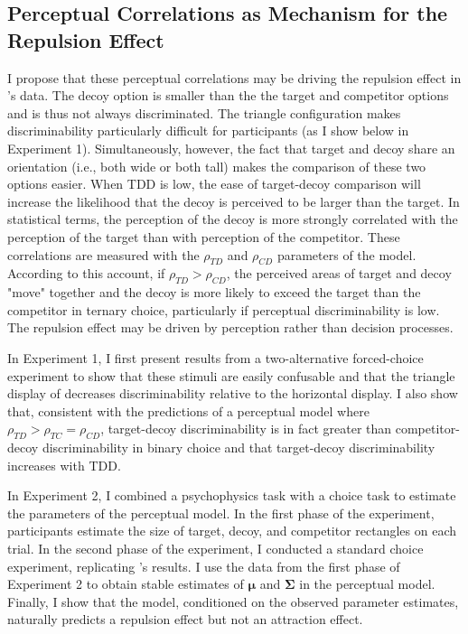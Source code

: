 \subsection{Perceptual Correlations as Mechanism for the Repulsion Effect}
I propose that these perceptual correlations may be driving the repulsion effect in \textcite{spektorWhenGoodLooks2018b}'s data. The decoy option is smaller than the the target and competitor options and is thus not always discriminated. The triangle configuration makes discriminability particularly difficult for participants (as I show below in Experiment 1). Simultaneously, however, the fact that target and decoy share an orientation (i.e., both wide or both tall) makes the comparison of these two options easier. When TDD is low, the ease of target-decoy comparison will increase the likelihood that the decoy is perceived to be larger than the target. In statistical terms, the perception of the decoy is more strongly correlated with the perception of the target than with perception of the competitor. These correlations are measured with the $\rho_{TD}$ and $\rho_{CD}$ parameters of the model. According to this account, if $\rho_{TD}>\rho_{CD}$, the perceived areas of target and decoy "move" together and the decoy is more likely to exceed the target than the competitor in ternary choice, particularly if perceptual discriminability is low. The repulsion effect may be driven by perception rather than decision processes. 

In Experiment 1, I first present results from a two-alternative forced-choice experiment to show that these stimuli are easily confusable and that the triangle display of \textcite{spektorWhenGoodLooks2018b} decreases discriminability relative to the horizontal display. I also show that, consistent with the predictions of a perceptual model where $\rho_{TD}>\rho_{TC}=\rho_{CD}$, target-decoy discriminability is in fact greater than competitor-decoy discriminability in binary choice and that target-decoy discriminability increases with TDD. 

In Experiment 2, I combined a psychophysics task with a choice task to estimate the parameters of the perceptual model. In the first phase of the experiment, participants estimate the size of target, decoy, and competitor rectangles on each trial. In the second phase of the experiment, I conducted a standard choice experiment, replicating \textcite{spektorWhenGoodLooks2018b}'s results. I use the data from the first phase of Experiment 2 to obtain stable estimates of  $\boldsymbol{\mu}$ and $\boldsymbol{\Sigma}$ in the perceptual model. Finally, I show that the model, conditioned on the observed parameter estimates, naturally predicts a repulsion effect but not an attraction effect.  

